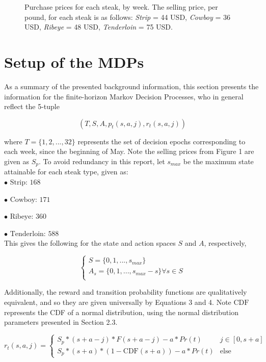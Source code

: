 \documentclass[12pt,a4paper]{article}
\begin{document}
\begin{figure}[H]
\caption{Purchase prices for each steak, by week. The selling price, per pound, for each steak is as follows: \textit{Strip} = 44 USD, \textit{Cowboy} = 36 USD, \textit{Ribeye} = 48 USD, \textit{Tenderloin} = 75 USD.}
\end{figure}

\section{Setup of the MDPs}

As a summary of the presented background information, this section presents the information for the finite-horizon Markov Decision Processes, who in general reflect the 5-tuple

$$(T, S, A, p_{t}(s,a,j), r_{t}(s,a,j)) $$

where $T = \{1,2,...,32\}$ represents the set of decision epochs corresponding to each week, since the beginning of May. Note the selling prices from Figure 1 are given as $S_{p}$. To avoid redundancy in this report, let $s_{max}$ be the maximum state attainable for each steak type, given as:
\\

$ \bullet \text{ Strip: } 168  $

$ \bullet \text{ Cowboy: } 171  $

$ \bullet \text{ Ribeye: } 360  $

$ \bullet \text{ Tenderloin: } 588  $
\\

This gives the following for the state and action spaces $S$ and $A$, respectively,

$$\begin{cases}
S = \{0, 1, ..., s_{max} \} \\
A_{s} = \{0, 1, ..., s_{max} - s \} \forall s \in S \\
\end{cases}$$

Additionally, the reward and transition probability functions are qualitatively equivalent, and so they are given universally by Equations 3 and 4. Note $\text{CDF}$ represents the CDF of a normal distribution, using the normal distribution parameters presented in Section 2.3.

\small
\begin{equation} \label{3}
r_{t}(s,a,j) = \begin{cases} S_{p} *(s + a - j) * F(s + a - j) - a*Pr(t) & j \in [0,s+a] \\ S_{p} *(s + a) * (1 -  \text{CDF}(s + a)) - a*Pr(t) & \text{else} \end{cases} 
\end{equation}
\end{document}
